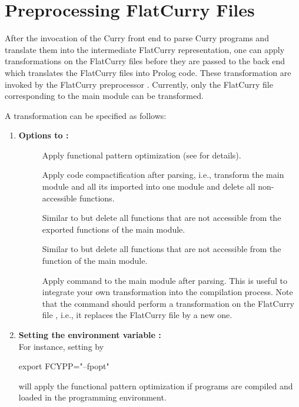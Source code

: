 \section{Preprocessing FlatCurry Files}
\label{sec-pakcspp}

After the invocation of the Curry front end to parse
Curry programs and translate them into the intermediate FlatCurry
representation, one can apply transformations on the FlatCurry files
before they are passed to the back end which translates
the FlatCurry files into Prolog code.
These transformation are invoked by the FlatCurry preprocessor
.
Currently, only the FlatCurry file corresponding to the main module
can be transformed.

A transformation can be specified as follows:
\begin{enumerate}
\item {\bf Options to :}
\begin{description}
\item[]
Apply functional pattern optimization
(see  for details).

\item[]
Apply code compactification after parsing, i.e., transform the main
module and all its imported into one module and delete all
non-accessible functions.

\item[]
Similar to  but delete all functions that are not accessible
from the exported functions of the main module.

\item[]
Similar to  but delete all functions that are not accessible
from the function  of the main module.

\item[]
Apply command  to the main module after parsing. This is useful to
integrate your own transformation into the compilation process.
Note that the command  should perform a transformation
on the FlatCurry file , i.e., it replaces the FlatCurry
file by a new one.
\end{description}

\item {\bf Setting the environment variable :}\\
For instance, setting  by
\begin{curry}
export FCYPP="--fpopt"
\end{curry}
will apply the functional pattern optimization if programs are compiled
and loaded in the \CYS programming environment.


\end{enumerate}
